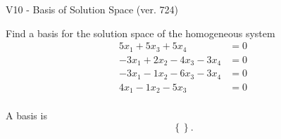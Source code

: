\begin{exercise}
  \begin{exerciseTitle}V10 - Basis of Solution Space (ver. 724)\end{exerciseTitle}
  \begin{exerciseStatement}
    Find a basis for the solution space of the homogeneous system 
\begin{align*}
 5 x_ 1 + 5 x_ 3 + 5 x_ 4 &= 0  \\ 
  -3 x_ 1 + 2 x_ 2 -4 x_ 3 -3 x_ 4 &= 0  \\ 
  -3 x_ 1 -1 x_ 2 -6 x_ 3 -3 x_ 4 &= 0  \\ 
  4 x_ 1 -1 x_ 2 -5 x_ 3 &= 0  \\ 
 \end{align*}


 
  \end{exerciseStatement}

  \begin{exerciseAnswer}
   A basis is   
\[\left\{\right\}.\]

  


  \end{exerciseAnswer}
\end{exercise}